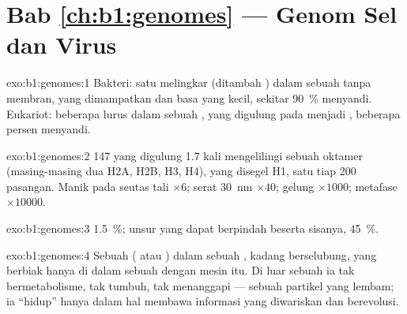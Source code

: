 \section*{Bab \ref{ch:b1:genomes} --- Genom Sel dan Virus}

\begin{solution}{exo:b1:genomes:1}
Bakteri: satu  melingkar (ditambah ) dalam sebuah
 tanpa membran, yang dimampatkan  dan  basa
yang kecil, sekitar \qty{90}{\%} menyandi. Eukariot: beberapa 
lurus dalam sebuah , yang digulung pada  menjadi ,
beberapa persen menyandi.
\end{solution}

\begin{solution}{exo:b1:genomes:2}
147  yang digulung 1.7 kali mengelilingi sebuah oktamer
 (masing-masing dua H2A, H2B, H3, H4), yang disegel H1, satu tiap
200 pasangan. Manik pada seutas tali $\times 6$; serat \qty{30}{nm}
$\times 40$; gelung $\times 1000$;  metafase $\times \num{10000}$.
\end{solution}

\begin{solution}{exo:b1:genomes:3}
\qty{1.5}{\%}; unsur yang dapat berpindah beserta sisanya, \qty{45}{\%}.
\end{solution}

\begin{solution}{exo:b1:genomes:4}
Sebuah  ( atau ) dalam sebuah  , kadang
berselubung, yang berbiak hanya di dalam sebuah  dengan mesin 
itu. Di luar sebuah  ia tak bermetabolisme, tak tumbuh, tak
menanggapi --- sebuah partikel yang lembam; ia ``hidup'' hanya dalam hal
membawa informasi yang diwariskan dan berevolusi.
\end{solution}

